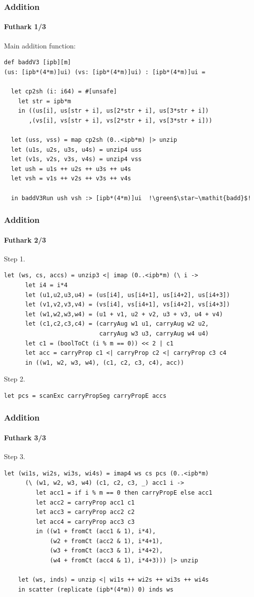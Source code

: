 \begin{frame}[fragile]
  \frametitle{Addition}
  \framesubtitle{Futhark 1/3}
  Main addition function:
\begin{lstlisting}[language=futhark,gobble=0,basicstyle=\scriptsize,escapeinside=!!,frame=single]
def baddV3 [ipb][m]
(us: [ipb*(4*m)]ui) (vs: [ipb*(4*m)]ui) : [ipb*(4*m)]ui =

  let cp2sh (i: i64) = #[unsafe]
    let str = ipb*m
    in ((us[i], us[str + i], us[2*str + i], us[3*str + i])
       ,(vs[i], vs[str + i], vs[2*str + i], vs[3*str + i]))

  let (uss, vss) = map cp2sh (0..<ipb*m) |> unzip
  let (u1s, u2s, u3s, u4s) = unzip4 uss
  let (v1s, v2s, v3s, v4s) = unzip4 vss
  let ush = u1s ++ u2s ++ u3s ++ u4s
  let vsh = v1s ++ v2s ++ v3s ++ v4s

  in baddV3Run ush vsh :> [ipb*(4*m)]ui  !\green$\star~\mathit{badd}$!
\end{lstlisting}
\end{frame}

\begin{frame}[fragile]
  \frametitle{Addition}
  \framesubtitle{Futhark 2/3}
  Step 1.
\begin{lstlisting}[language=futhark,gobble=4,basicstyle=\scriptsize,frame=single,firstnumber=16]
    let (ws, cs, accs) = unzip3 <| imap (0..<ipb*m) (\ i ->
      let i4 = i*4
      let (u1,u2,u3,u4) = (us[i4], us[i4+1], us[i4+2], us[i4+3])
      let (v1,v2,v3,v4) = (vs[i4], vs[i4+1], vs[i4+2], vs[i4+3])
      let (w1,w2,w3,w4) = (u1 + v1, u2 + v2, u3 + v3, u4 + v4)
      let (c1,c2,c3,c4) = (carryAug w1 u1, carryAug w2 u2,
                           carryAug w3 u3, carryAug w4 u4)
      let c1 = (boolToCt (i % m == 0)) << 2 | c1
      let acc = carryProp c1 <| carryProp c2 <| carryProp c3 c4
      in ((w1, w2, w3, w4), (c1, c2, c3, c4), acc))
\end{lstlisting}
  Step 2.
\begin{lstlisting}[language=futhark,gobble=4,basicstyle=\scriptsize,firstnumber=27,frame=single]
    let pcs = scanExc carryPropSeg carryPropE accs
\end{lstlisting}
\end{frame}

\begin{frame}[fragile]
  \frametitle{Addition}
  \framesubtitle{Futhark 3/3}
  Step 3.
\begin{lstlisting}[language=futhark,gobble=4,basicstyle=\scriptsize,firstnumber=28,frame=single]
    let (wi1s, wi2s, wi3s, wi4s) = imap4 ws cs pcs (0..<ipb*m)
      (\ (w1, w2, w3, w4) (c1, c2, c3, _) acc1 i ->
         let acc1 = if i % m == 0 then carryPropE else acc1
         let acc2 = carryProp acc1 c1
         let acc3 = carryProp acc2 c2
         let acc4 = carryProp acc3 c3
         in ((w1 + fromCt (acc1 & 1), i*4),
             (w2 + fromCt (acc2 & 1), i*4+1),
             (w3 + fromCt (acc3 & 1), i*4+2),
             (w4 + fromCt (acc4 & 1), i*4+3))) |> unzip

    let (ws, inds) = unzip <| wi1s ++ wi2s ++ wi3s ++ wi4s
    in scatter (replicate (ipb*(4*m)) 0) inds ws
\end{lstlisting}
\end{frame}

